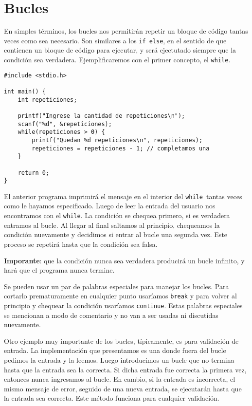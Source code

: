 \documentclass[10pt]{article}
\newcommand{\cif}[0]{\lstinline{if}}
\newcommand{\celse}[0]{\lstinline{else}}
\newcommand{\cwhile}[0]{\lstinline{while}}
\begin{document}
\section{Bucles}

En simples términos, los bucles nos permitirán repetir un bloque de código tantas veces como sea necesario. Son similares a los \cif\ \celse, en el sentido de que contienen un bloque de código para ejecutar, y será ejectutado siempre que la condición sea verdadera. Ejemplificaremos con el primer concepto, el \cwhile.

\begin{lstlisting}
#include <stdio.h>

int main() {
	int repeticiones;

	printf("Ingrese la cantidad de repeticiones\n");
	scanf("%d", &repeticiones);
	while(repeticiones > 0) {
		printf("Quedan %d repeticiones\n", repeticiones);
		repeticiones = repeticiones - 1; // completamos una
	}

	return 0;
}
\end{lstlisting}

El anterior programa imprimirá el mensaje en el interior del \cwhile\ tantas veces como le hayamos especificado. Luego de leer la entrada del usuario nos encontramos con el \cwhile. La condición se chequea primero, si es verdadera entramos al bucle. Al llegar al final saltamos al principio, chequeamos la condición nuevamente y decidimos si entrar al bucle una segunda vez. Este proceso se repetirá hasta que la condición sea falsa.

\bigskip

\textbf{Imporante}: que la condición nunca sea verdadera producirá un bucle infinito, y hará que el programa nunca termine.

\bigskip

Se pueden usar un par de palabras especiales para manejar los bucles. Para cortarlo prematuramente en cualquier punto usaríamos \lstinline{break} y para volver al principio y chequear la condición usaríamos \lstinline{continue}. Estas palabras especiales se mencionan a modo de comentario y no van a ser usadas ni discutidas nuevamente.

\bigskip

Otro ejemplo muy importante de los bucles, típicamente, es para validación de entrada. La implementación que presentamos es una donde fuera del bucle pedimos la entrada y la leemos. Luego introducimos un bucle que no termina hasta que la entrada sea la correcta. Si dicha entrada fue correcta la primera vez, entonces nunca ingresamos al bucle. En cambio, si la entrada es incorrecta, el mismo mensaje de error, seguido de una nueva entrada, se ejecutarán hasta que la entrada sea correcta. Este método funciona para cualquier validación.
\end{document}
